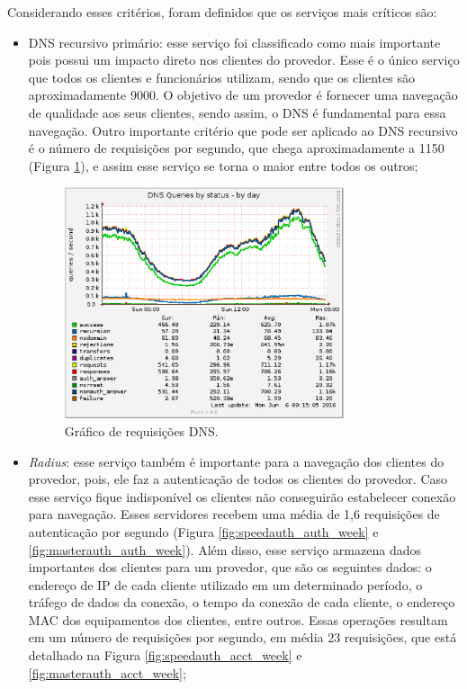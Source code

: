 Considerando esses critérios, foram definidos que os serviços mais críticos são:
\begin{itemize}
 \item \ac{DNS} recursivo primário: esse serviço foi classificado como mais importante pois possui um impacto direto nos clientes do provedor. 
 Esse é o único serviço que todos os clientes e funcionários utilizam, sendo que os clientes são aproximadamente 9000. O objetivo de um provedor 
 é fornecer uma navegação de qualidade aos seus clientes, sendo assim, o \ac{DNS} é fundamental para essa navegação. Outro importante critério
 que pode ser aplicado ao \ac{DNS} recursivo é o número de requisições por segundo, que chega aproximadamente a 1150 (Figura \ref{fig:passata_day}),
 e assim esse serviço se torna o maior entre todos os outros;
 
\begin{figure}[h!]
 \centering
 \includegraphics[width=310px]{img/passata_day.eps}
 \caption{Gráfico de requisições DNS.}
 \label{fig:passata_day}
\end{figure}

 \item \textit{Radius}: esse serviço também é importante para a navegação dos clientes do provedor, pois, ele faz a autenticação de todos os 
 clientes do provedor. Caso esse serviço fique indisponível os clientes não conseguirão estabelecer conexão para navegação. Esses servidores 
 recebem uma média de 1,6 requisições de autenticação por segundo (Figura \ref{fig:speedauth_auth_week} e \ref{fig:masterauth_auth_week}). 
 Além disso, esse serviço armazena dados importantes dos clientes para um provedor, que são os seguintes dados: o endereço de \ac{IP} de cada 
 cliente utilizado em um determinado período, o tráfego de dados da conexão, o tempo da conexão de cada cliente, o endereço \ac{MAC} dos 
 equipamentos dos clientes, entre outros. Essas operações resultam em um número de requisições por segundo, em média 23 requisições, que está 
 detalhado na Figura \ref{fig:speedauth_acct_week} e \ref{fig:masterauth_acct_week};
 

\end{itemize}
